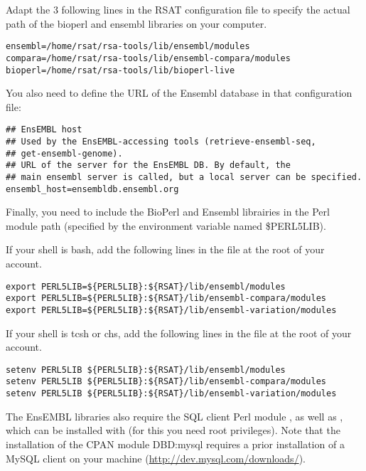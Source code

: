 \documentclass[12pt,a4paper, oneside]{scrreprt} %
\begin{document}
Adapt the 3 following lines in the RSAT configuration file
 to specify the actual path of the bioperl
and ensembl libraries on your computer.

\begin{lstlisting}
ensembl=/home/rsat/rsa-tools/lib/ensembl/modules
compara=/home/rsat/rsa-tools/lib/ensembl-compara/modules
bioperl=/home/rsat/rsa-tools/lib/bioperl-live
\end{lstlisting}

You also need to define the URL of the Ensembl database in that
configuration file:

\begin{lstlisting}
## EnsEMBL host
## Used by the EnsEMBL-accessing tools (retrieve-ensembl-seq,
## get-ensembl-genome).
## URL of the server for the EnsEMBL DB. By default, the
## main ensembl server is called, but a local server can be specified.
ensembl_host=ensembldb.ensembl.org
\end{lstlisting}

Finally, you need to include the BioPerl and Ensembl librairies in the
Perl module path (specified by the environment variable named
\$PERL5LIB).

If your shell is bash, add the following lines in the file
 at the root of your account.

\begin{lstlisting}
export PERL5LIB=${PERL5LIB}:${RSAT}/lib/ensembl/modules
export PERL5LIB=${PERL5LIB}:${RSAT}/lib/ensembl-compara/modules
export PERL5LIB=${PERL5LIB}:${RSAT}/lib/ensembl-variation/modules
\end{lstlisting}

If your shell is tcsh or chs, add the following lines in the file
 at the root of your account.

\begin{lstlisting}
setenv PERL5LIB ${PERL5LIB}:${RSAT}/lib/ensembl/modules
setenv PERL5LIB ${PERL5LIB}:${RSAT}/lib/ensembl-compara/modules
setenv PERL5LIB ${PERL5LIB}:${RSAT}/lib/ensembl-variation/modules
\end{lstlisting}



The EnsEMBL libraries also require the SQL client Perl module
, as well as , which can be installed with
 (for this you need root privileges). Note that the
installation of the CPAN module DBD:mysql requires a prior
installation of a MySQL client on your machine
(\url{http://dev.mysql.com/downloads/}).
\end{document}
